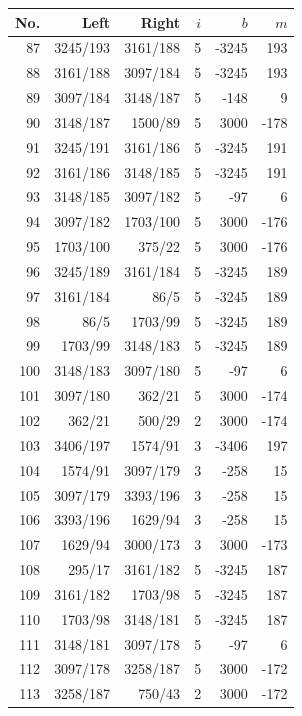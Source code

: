 \documentclass[11pt,a4paper]{article}
\begin{document}
\noindent\begin{minipage}[t]{.49\linewidth}\centering\footnotesize\setlength{\tabcolsep}{2pt}\renewcommand{\arraystretch}{1.09}
\begin{tabular*}{\linewidth}{@{}r@{\extracolsep{\fill}}rrrrr@{}}\toprule
No. & Left & Right & $i$ & $b$ & $m$\\\midrule
87 & 3245/193 & 3161/188 & 5 & -3245 & 193\\
88 & 3161/188 & 3097/184 & 5 & -3245 & 193\\
89 & 3097/184 & 3148/187 & 5 & -148 & 9\\
90 & 3148/187 & 1500/89 & 5 & 3000 & -178\\
91 & 3245/191 & 3161/186 & 5 & -3245 & 191\\
92 & 3161/186 & 3148/185 & 5 & -3245 & 191\\
93 & 3148/185 & 3097/182 & 5 & -97 & 6\\
94 & 3097/182 & 1703/100 & 5 & 3000 & -176\\
95 & 1703/100 & 375/22 & 5 & 3000 & -176\\
96 & 3245/189 & 3161/184 & 5 & -3245 & 189\\
97 & 3161/184 & 86/5 & 5 & -3245 & 189\\
98 & 86/5 & 1703/99 & 5 & -3245 & 189\\
99 & 1703/99 & 3148/183 & 5 & -3245 & 189\\
100 & 3148/183 & 3097/180 & 5 & -97 & 6\\
101 & 3097/180 & 362/21 & 5 & 3000 & -174\\
102 & 362/21 & 500/29 & 2 & 3000 & -174\\
103 & 3406/197 & 1574/91 & 3 & -3406 & 197\\
104 & 1574/91 & 3097/179 & 3 & -258 & 15\\
105 & 3097/179 & 3393/196 & 3 & -258 & 15\\
106 & 3393/196 & 1629/94 & 3 & -258 & 15\\
107 & 1629/94 & 3000/173 & 3 & 3000 & -173\\
108 & 295/17 & 3161/182 & 5 & -3245 & 187\\
109 & 3161/182 & 1703/98 & 5 & -3245 & 187\\
110 & 1703/98 & 3148/181 & 5 & -3245 & 187\\
111 & 3148/181 & 3097/178 & 5 & -97 & 6\\
112 & 3097/178 & 3258/187 & 5 & 3000 & -172\\
113 & 3258/187 & 750/43 & 2 & 3000 & -172\\

\end{tabular*}
\end{minipage}
\end{document}
